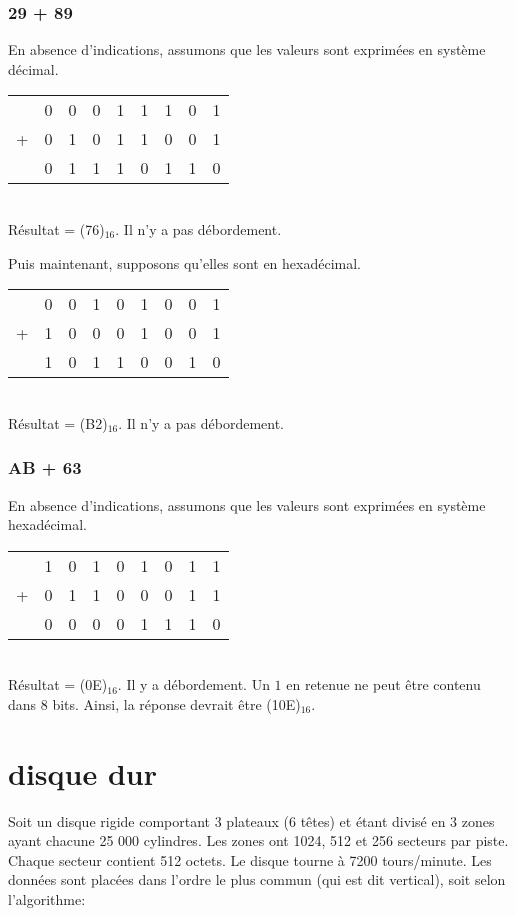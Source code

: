 \documentclass[10pt,letterpaper]{article}
\begin{document}
\subsubsection{29 + 89}
En absence d'indications, assumons que les valeurs sont exprimées en système décimal. \\
\begin{tabular}{c@{\:}c@{}c@{}c@{}c@{\;}c@{}c@{}c@{}c}
  & 0 & 0 & 0 & 1 & 1 & 1 & 0 & 1\\
+ & 0 & 1 & 0 & 1 & 1 & 0 & 0 & 1\\
\hline
  & 0 & 1 & 1 & 1 & 0 & 1 & 1 & 0
\end{tabular}\\
Résultat = (76)$_{16}$. Il n'y a pas débordement.
\medskip

Puis maintenant, supposons qu'elles sont en hexadécimal. \\
\begin{tabular}{c@{\:}c@{}c@{}c@{}c@{\;}c@{}c@{}c@{}c}
  & 0 & 0 & 1 & 0 & 1 & 0 & 0 & 1\\
+ & 1 & 0 & 0 & 0 & 1 & 0 & 0 & 1\\
\hline
  & 1 & 0 & 1 & 1 & 0 & 0 & 1 & 0
\end{tabular}\\
Résultat = (B2)$_{16}$. Il n'y a pas débordement.
\medskip

\subsubsection{AB + 63}
En absence d'indications, assumons que les valeurs sont exprimées en système hexadécimal. \\
\begin{tabular}{c@{\:}c@{}c@{}c@{}c@{\;}c@{}c@{}c@{}c}
  & 1 & 0 & 1 & 0 & 1 & 0 & 1 & 1\\
+ & 0 & 1 & 1 & 0 & 0 & 0 & 1 & 1\\
\hline
  & 0 & 0 & 0 & 0 & 1 & 1 & 1 & 0\\
\end{tabular}\\
Résultat = (0E)$_{16}$. Il y a débordement. Un $1$ en retenue ne peut être contenu dans 8 bits. Ainsi, la réponse devrait être (10E)$_{16}$.

\newpage
\section{disque dur}
Soit un disque rigide comportant 3 plateaux (6 têtes) et étant divisé en 3 zones ayant chacune 25 000 cylindres. Les zones ont 1024, 512 et 256 secteurs par piste. Chaque secteur contient 512 octets. Le disque tourne à 7200 tours/minute. Les données sont placées dans l'ordre le plus commun (qui est dit vertical), soit selon l’algorithme:
\end{document}
